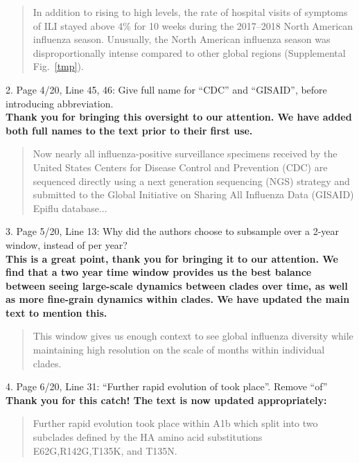 \documentclass[11pt,oneside,letterpaper]{article}
\begin{document}
\begin{quotation}
  In addition to rising to high levels, the rate of hospital visits of symptoms of ILI stayed above 4\% for 10 weeks during the 2017--2018 North American influenza season.
  Unusually, the North American influenza season was disproportionally intense compared to other global regions (Supplemental Fig.~\ref{tmp}).
\end{quotation}

2. Page 4/20, Line 45, 46: Give full name for “CDC” and “GISAID”, before introducing abbreviation.\\

\textbf{Thank you for bringing this oversight to our attention. We have added both full names to the text prior to their first use.}

\begin{quotation}
Now nearly all influenza-positive surveillance specimens received by the United States Centers for Disease Control and Prevention (CDC) are sequenced directly using a next generation sequencing (NGS) strategy and submitted to the Global Initiative on Sharing All Influenza Data (GISAID) Epiflu database...
\end{quotation}

3. Page 5/20, Line 13: Why did the authors choose to subsample over a 2-year window, instead of per year?\\

\textbf{This is a great point, thank you for bringing it to our attention. We find that a two year time window provides us the best balance between seeing large-scale dynamics between clades over time, as well as more fine-grain dynamics within clades. We have updated the main text to mention this.}

\begin{quotation}
  This window gives us enough context to see global influenza diversity while maintaining high resolution on the scale of months within individual clades.
\end{quotation}

4. Page 6/20, Line 31: “Further rapid evolution of took place”. Remove “of”\\

\textbf{Thank you for this catch! The text is now updated appropriately:}

\begin{quotation}
  Further rapid evolution took place within A1b which split into two subclades defined by the HA amino acid substitutions E62G,R142G,T135K, and T135N.
\end{quotation}
\end{document}
